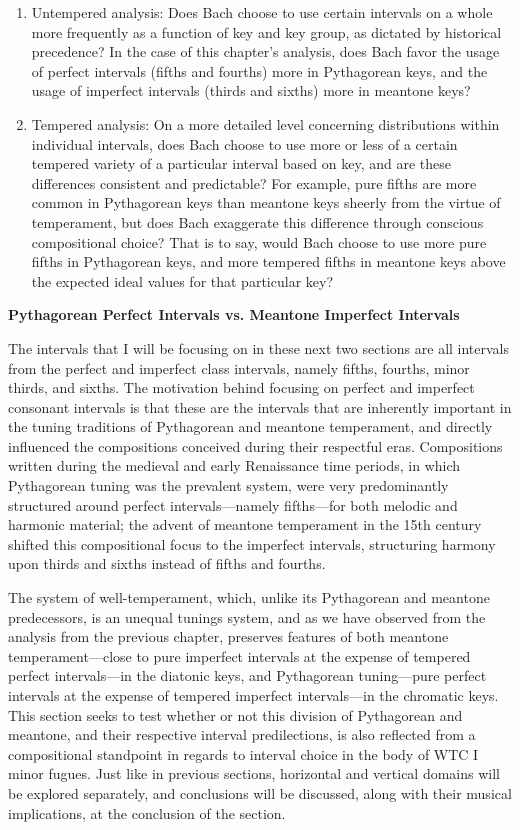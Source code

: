 \begin{enumerate}
\def\labelenumi{\arabic{enumi}.}
\tightlist
\item
  Untempered analysis: Does Bach choose to use certain intervals on a
  whole more frequently as a function of key and key group, as dictated
  by historical precedence? In the case of this chapter's analysis, does
  Bach favor the usage of perfect intervals (fifths and fourths) more in
  Pythagorean keys, and the usage of imperfect intervals (thirds and
  sixths) more in meantone keys?
\item
  Tempered analysis: On a more detailed level concerning distributions
  within individual intervals, does Bach choose to use more or less of a
  certain tempered variety of a particular interval based on key, and
  are these differences consistent and predictable? For example, pure
  fifths are more common in Pythagorean keys than meantone keys sheerly
  from the virtue of temperament, but does Bach exaggerate this
  difference through conscious compositional choice? That is to say,
  would Bach choose to use more pure fifths in Pythagorean keys, and
  more tempered fifths in meantone keys above the expected ideal values
  for that particular key?
\end{enumerate}

\textbf{Pythagorean Perfect Intervals vs. Meantone Imperfect Intervals}

The intervals that I will be focusing on in these next two sections are
all intervals from the perfect and imperfect class intervals, namely
fifths, fourths, minor thirds, and sixths. The motivation behind
focusing on perfect and imperfect consonant intervals is that these are
the intervals that are inherently important in the tuning traditions of
Pythagorean and meantone temperament, and directly influenced the
compositions conceived during their respectful eras. Compositions
written during the medieval and early Renaissance time periods, in which
Pythagorean tuning was the prevalent system, were very predominantly
structured around perfect intervals---namely fifths---for both
melodic and harmonic material; the advent of meantone temperament in the
15th century shifted this compositional focus to the imperfect
intervals, structuring harmony upon thirds and sixths instead of fifths
and fourths.

The system of well-temperament, which, unlike its Pythagorean and
meantone predecessors, is an unequal tunings system, and as we have
observed from the analysis from the previous chapter, preserves features
of both meantone temperament---close to pure imperfect intervals at
the expense of tempered perfect intervals---in the diatonic keys,
and Pythagorean tuning---pure perfect intervals at the expense of
tempered imperfect intervals---in the chromatic keys. This section
seeks to test whether or not this division of Pythagorean and meantone,
and their respective interval predilections, is also reflected from a
compositional standpoint in regards to interval choice in the body of
WTC I minor fugues. Just like in previous sections, horizontal and
vertical domains will be explored separately, and conclusions will be
discussed, along with their musical implications, at the conclusion of
the section.

